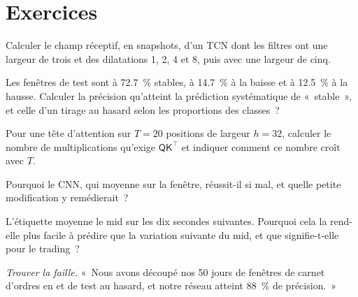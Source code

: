 \section{Exercices}

\begin{exercise}[$\star$]\label{exo:ml:sequence-models-on-order-books:1}
Calculer le champ réceptif, en snapshots, d'un TCN dont les filtres ont une largeur de trois et des dilatations 1, 2, 4 et 8, puis avec une largeur de cinq.
\end{exercise}

\begin{exercise}[$\star$]\label{exo:ml:sequence-models-on-order-books:2}
Les fenêtres de test sont à 72.7~\% stables, à 14.7~\% à la baisse et à 12.5~\% à la hausse. Calculer la précision qu'atteint la prédiction systématique de «~stable~», et
celle d'un tirage au hasard selon les proportions des classes~?
\end{exercise}

\begin{exercise}[$\star$]\label{exo:ml:sequence-models-on-order-books:3}
Pour une tête d'attention sur $T = 20$ positions de largeur $h = 32$, calculer le nombre de multiplications qu'exige $\mathsf Q\mathsf K^\top$
et indiquer comment ce nombre croît avec $T$.
\end{exercise}

\begin{exercise}[$\star\star$]\label{exo:ml:sequence-models-on-order-books:4}
Pourquoi le CNN, qui moyenne sur la fenêtre, réussit-il si mal, et quelle petite modification y remédierait~?
\end{exercise}

\begin{exercise}[$\star\star$]\label{exo:ml:sequence-models-on-order-books:5}
L'étiquette moyenne le mid sur les dix secondes suivantes. Pourquoi cela la rend-elle plus facile à prédire que la variation suivante du mid,
et que signifie-t-elle pour le trading~?
\end{exercise}

\begin{exercise}[$\star\star$]\label{exo:ml:sequence-models-on-order-books:6}
\emph{Trouver la faille.} «~Nous avons découpé nos 50 jours de fenêtres de carnet d'ordres en  et de test au hasard, et notre réseau atteint 88~\%
de précision.~»
\end{exercise}

